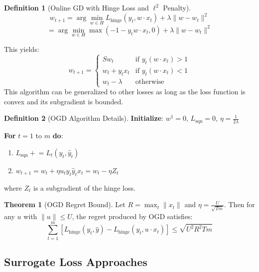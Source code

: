 \documentclass[12pt,a4paper]{article}
\theoremstyle{definition}
\newtheorem{definition}{Definition}[section]
\newtheorem{theorem}{Theorem}[section]
\begin{document}
\begin{definition}[Online GD with Hinge Loss and $\ell^2$ Penalty]
\[
w_{t+1} = \arg\min_{w \in H} L_{\text{hinge}}(y_t, w \cdot x_t) + \lambda \|w - w_t\|^2
\]
\[
= \arg\min_{w \in H} \max\left(-1 - y_t w \cdot x_t, 0\right) + \lambda \|w - w_t\|^2
\]

This yields:
\[
w_{t+1} = \begin{cases}
S w_t & \text{if } y_t(w \cdot x_t) > 1 \\
w_t + y_t x_t & \text{if } y_t(w \cdot x_t) < 1 \\
w_t - \lambda & \text{otherwise}
\end{cases}
\]
This algorithm can be generalized to other losses as long as the loss function is convex and its subgradient is bounded.
\end{definition}

\begin{definition}[OGD Algorithm Details]
\textbf{Initialize}: $w^1 = 0$, $L_{\text{sqn}} = 0$, $\eta = \frac{1}{2\lambda}$

\textbf{For } $t = 1$ to $m$ \textbf{ do}:
\begin{enumerate}
    \item $L_{\text{sqn}} \mathrel{+}= L_t(y_t, \hat{y}_t)$
    \item $w_{t+1} = w_t + \eta u_t y_t \hat{y}_{t} x_t = w_t - \eta Z_t$
\end{enumerate}
where $Z_t$ is a subgradient of the hinge loss.
\end{definition}

\begin{theorem}[OGD Regret Bound]
Let $R = \max_t \|x_t\|$ and $\eta = \frac{U}{\sqrt{Tm}}$. Then for any $u$ with $\|u\| \leq U$, the regret produced by OGD satisfies:
\[
\sum_{t=1}^m \left[L_{\text{hinge}}(y_t, \hat{y}) - L_{\text{hinge}}(y_t, u \cdot x_t)\right] \leq \sqrt{U^2 R^2 T m}
\]
\end{theorem}

\subsection{Surrogate Loss Approaches}
\end{document}
